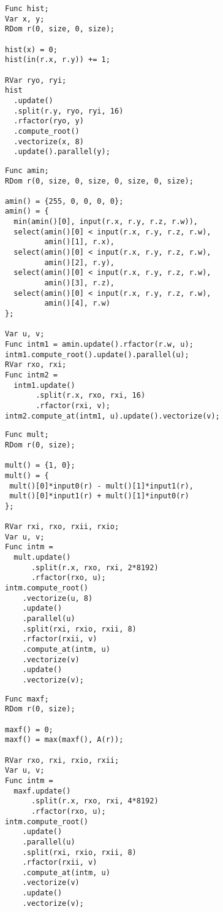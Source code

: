 
\begin{lstlisting}[caption={Benchmark code for histogram of a two-dimensional image.}, label={lst:benchmark_histogram}]
Func hist;
Var x, y;
RDom r(0, size, 0, size);

hist(x) = 0;
hist(in(r.x, r.y)) += 1;

RVar ryo, ryi;
hist
  .update()
  .split(r.y, ryo, ryi, 16)
  .rfactor(ryo, y)
  .compute_root()
  .vectorize(x, 8)
  .update().parallel(y);
\end{lstlisting}

\begin{lstlisting}[caption={Benchmark code for argmin over 4D array}, label={lst:benchmark_argmin}]
Func amin;
RDom r(0, size, 0, size, 0, size, 0, size);

amin() = {255, 0, 0, 0, 0};
amin() = {
  min(amin()[0], input(r.x, r.y, r.z, r.w)),
  select(amin()[0] < input(r.x, r.y, r.z, r.w),
         amin()[1], r.x),
  select(amin()[0] < input(r.x, r.y, r.z, r.w),
         amin()[2], r.y),
  select(amin()[0] < input(r.x, r.y, r.z, r.w),
         amin()[3], r.z),
  select(amin()[0] < input(r.x, r.y, r.z, r.w),
         amin()[4], r.w)
};

Var u, v;
Func intm1 = amin.update().rfactor(r.w, u);
intm1.compute_root().update().parallel(u);
RVar rxo, rxi;
Func intm2 =
  intm1.update()
       .split(r.x, rxo, rxi, 16)
       .rfactor(rxi, v);
intm2.compute_at(intm1, u).update().vectorize(v);
\end{lstlisting}

\begin{lstlisting}[caption={Benchmark code for complex product}, label={lst:benchmark_complex_multiply}]
Func mult;
RDom r(0, size);

mult() = {1, 0};
mult() = {
 mult()[0]*input0(r) - mult()[1]*input1(r),
 mult()[0]*input1(r) + mult()[1]*input0(r)
};

RVar rxi, rxo, rxii, rxio;
Var u, v;
Func intm =
  mult.update()
      .split(r.x, rxo, rxi, 2*8192)
      .rfactor(rxo, u);
intm.compute_root()
    .vectorize(u, 8)
    .update()
    .parallel(u)
    .split(rxi, rxio, rxii, 8)
    .rfactor(rxii, v)
    .compute_at(intm, u)
    .vectorize(v)
    .update()
    .vectorize(v);
\end{lstlisting}

\begin{lstlisting}[caption={Benchmark code for finding the maximum value over 1D array}, label={lst:benchmark_max}]
Func maxf;
RDom r(0, size);

maxf() = 0;
maxf() = max(maxf(), A(r));

RVar rxo, rxi, rxio, rxii;
Var u, v;
Func intm =
  maxf.update()
      .split(r.x, rxo, rxi, 4*8192)
      .rfactor(rxo, u);
intm.compute_root()
    .update()
    .parallel(u)
    .split(rxi, rxio, rxii, 8)
    .rfactor(rxii, v)
    .compute_at(intm, u)
    .vectorize(v)
    .update()
    .vectorize(v);
\end{lstlisting}

